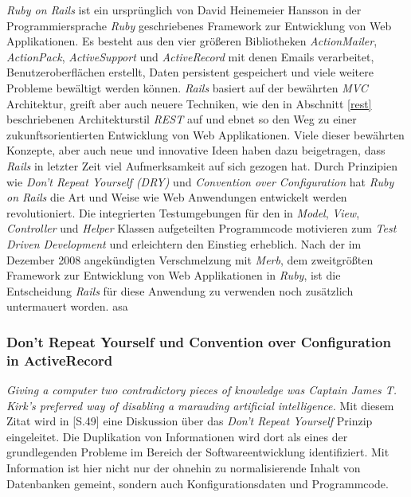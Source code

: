 \textit{Ruby on Rails} ist ein ursprünglich von David Heinemeier
Hansson in der Programmiersprache \textit{Ruby} geschriebenes
Framework zur Entwicklung von Web Applikationen. Es besteht aus den
vier größeren Bibliotheken \textit{ActionMailer}, \textit{ActionPack},
\textit{ActiveSupport} und \textit{ActiveRecord} mit denen Emails
verarbeitet, Benutzeroberflächen erstellt, Daten persistent
gespeichert und viele weitere Probleme bewältigt werden
können. \textit{Rails} basiert auf der bewährten \textit{MVC}
Architektur, greift aber auch neuere Techniken, wie den in Abschnitt
\ref{rest} beschriebenen Architekturstil \textit{REST}
 auf und ebnet so
den Weg zu einer zukunftsorientierten Entwicklung von Web
Applikationen. Viele dieser bewährten Konzepte, aber auch neue und
innovative Ideen haben dazu beigetragen, dass \textit{Rails} in
letzter Zeit viel Aufmerksamkeit auf sich gezogen hat. Durch
Prinzipien wie \textit{Don't Repeat Yourself (DRY)}
 und \textit{Convention over
  Configuration} hat \textit{Ruby on Rails} die Art und Weise wie Web
Anwendungen entwickelt werden revolutioniert. Die integrierten
Testumgebungen für den in \textit{Model}, \textit{View},
\textit{Controller} und \textit{Helper} Klassen aufgeteilten
Programmcode motivieren zum \textit{Test Driven Development} und
erleichtern den Einstieg erheblich.  Nach der im Dezember 2008
angekündigten Verschmelzung mit \textit{Merb}, dem zweitgrößten
Framework zur Entwicklung von Web Applikationen in \textit{Ruby}, ist
die Entscheidung \textit{Rails} für diese Anwendung zu verwenden noch
zusätzlich untermauert worden. \cite{AgileRails06} asa

\subsubsection{Don't Repeat Yourself und Convention over Configuration
  in ActiveRecord}

\textit{Giving a computer two contradictory pieces of knowledge was
  Captain James T. Kirk's preferred way of disabling a marauding
  artificial intelligence.} Mit diesem Zitat wird in
\cite{Hunt99}[S.49] eine Diskussion über das \textit{Don't Repeat
  Yourself} Prinzip eingeleitet. Die Duplikation von Informationen
wird dort als eines der grundlegenden Probleme im Bereich der
Softwareentwicklung identifiziert. Mit Information ist hier nicht nur
der ohnehin zu normalisierende Inhalt von Datenbanken gemeint, sondern
auch Konfigurationsdaten und Programmcode.

